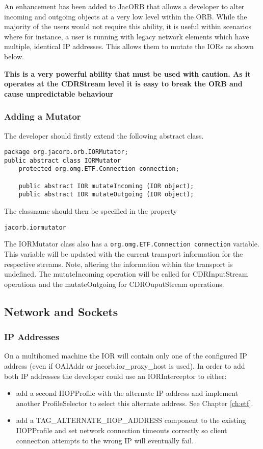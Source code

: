 An enhancement has been added to JacORB that allows a developer to alter incoming
and outgoing objects at a very low level within the ORB. While the majority of the
users would not require this ability, it is useful within scenarios where for instance,
a user is running with legacy network elements which have multiple, identical IP
addresses. This allows them to mutate the IORs as shown below.

\textbf{This is a very powerful ability that must be used with caution. As it operates
at the CDRStream level it is easy to break the ORB and cause unpredictable behaviour}

\subsubsection{Adding a Mutator}
The developer should firstly extend the following abstract class.
\begin{small}
\begin{verbatim}
package org.jacorb.orb.IORMutator;
public abstract class IORMutator
    protected org.omg.ETF.Connection connection;

    public abstract IOR mutateIncoming (IOR object);
    public abstract IOR mutateOutgoing (IOR object);
\end{verbatim}
\end{small}
The classname should then be specified in the property
\begin{verbatim}
jacorb.iormutator
\end{verbatim}

The IORMutator class also has a {\tt org.omg.ETF.Connection connection} variable. This
variable will be updated with the current transport information for the respective
streams. Note, altering the information within the transport is undefined. The
mutateIncoming operation will be called for CDRInputStream operations and the
mutateOutgoing for CDROuputStream operations.

\subsection{Network and Sockets}

\subsubsection{IP Addresses}
On a multihomed machine the IOR will contain only one of the configured
IP address (even if OAIAddr or jacorb.ior\_proxy\_host is used). In order to add both IP
addresses the developer could use an IORInterceptor to either:
\begin{itemize}
\item add a second IIOPProfile with the alternate IP address and implement another ProfileSelector to select this alternate address. See Chapter \ref{ch:etf}.
\item add a TAG\_ALTERNATE\_IIOP\_ADDRESS component to the existing IIOPProfile and set network connection timeouts correctly so client connection attempts to the wrong IP will eventually fail.
\end{itemize}


